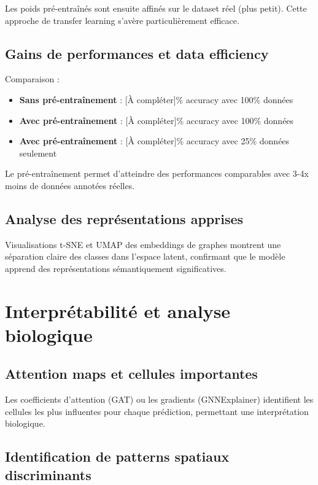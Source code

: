 Les poids pré-entraînés sont ensuite affinés sur le dataset réel (plus petit). Cette approche de transfer learning s'avère particulièrement efficace.

\subsection{Gains de performances et data efficiency}

Comparaison :
\begin{itemize}
    \item \textbf{Sans pré-entraînement} : [À compléter]\% accuracy avec 100\% données
    \item \textbf{Avec pré-entraînement} : [À compléter]\% accuracy avec 100\% données
    \item \textbf{Avec pré-entraînement} : [À compléter]\% accuracy avec 25\% données seulement
\end{itemize}

Le pré-entraînement permet d'atteindre des performances comparables avec 3-4x moins de données annotées réelles.

\subsection{Analyse des représentations apprises}

Visualisations t-SNE et UMAP des embeddings de graphes montrent une séparation claire des classes dans l'espace latent, confirmant que le modèle apprend des représentations sémantiquement significatives.

\section{Interprétabilité et analyse biologique}

\subsection{Attention maps et cellules importantes}

Les coefficients d'attention (GAT) ou les gradients (GNNExplainer) identifient les cellules les plus influentes pour chaque prédiction, permettant une interprétation biologique.

\subsection{Identification de patterns spatiaux discriminants}

